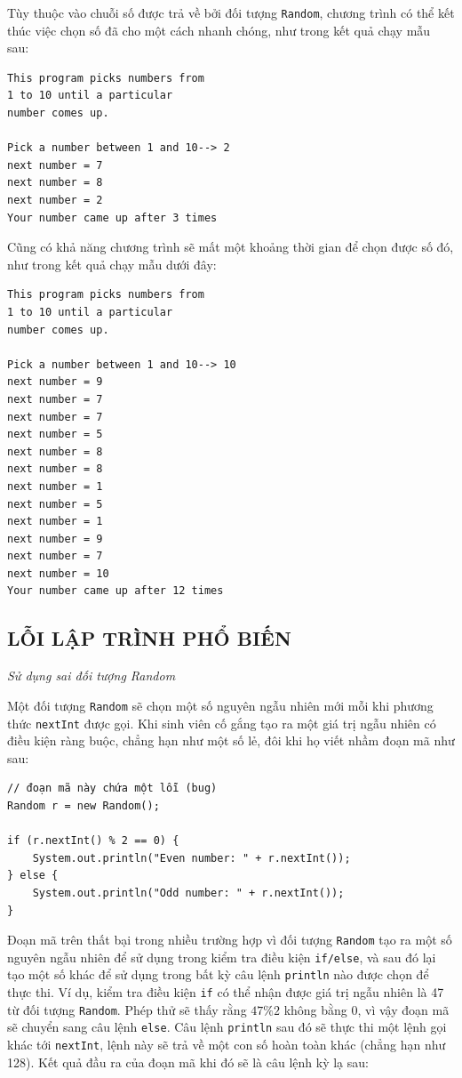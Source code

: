 Tùy thuộc vào chuỗi số được trả về bởi đối tượng \texttt{Random}, chương trình có thể kết thúc việc chọn số đã cho một cách nhanh chóng, như trong kết quả chạy mẫu sau:
\begin{verbatim}
This program picks numbers from 
1 to 10 until a particular 
number comes up. 
 
Pick a number between 1 and 10--> 2 
next number = 7 
next number = 8 
next number = 2 
Your number came up after 3 times
\end{verbatim}

Cũng có khả năng chương trình sẽ mất một khoảng thời gian để chọn được số đó, như trong kết quả chạy mẫu dưới đây:
\begin{verbatim}
This program picks numbers from 
1 to 10 until a particular 
number comes up. 
 
Pick a number between 1 and 10--> 10 
next number = 9 
next number = 7 
next number = 7 
next number = 5 
next number = 8 
next number = 8 
next number = 1 
next number = 5 
next number = 1 
next number = 9 
next number = 7 
next number = 10 
Your number came up after 12 times
\end{verbatim}

\subsection*{LỖI LẬP TRÌNH PHỔ BIẾN}
\textit{Sử dụng sai đối tượng Random}

Một đối tượng \texttt{Random} sẽ chọn một số nguyên ngẫu nhiên mới mỗi khi phương thức \texttt{nextInt} được gọi. Khi sinh viên cố gắng tạo ra một giá trị ngẫu nhiên có điều kiện ràng buộc, chẳng hạn như một số lẻ, đôi khi họ viết nhầm đoạn mã như sau:
\begin{verbatim}
// đoạn mã này chứa một lỗi (bug)
Random r = new Random(); 
 
if (r.nextInt() % 2 == 0) {
    System.out.println("Even number: " + r.nextInt());
} else {
    System.out.println("Odd number: " + r.nextInt());
}
\end{verbatim}

Đoạn mã trên thất bại trong nhiều trường hợp vì đối tượng \texttt{Random} tạo ra một số nguyên ngẫu nhiên để sử dụng trong kiểm tra điều kiện \texttt{if/else}, và sau đó lại tạo một số khác để sử dụng trong bất kỳ câu lệnh \texttt{println} nào được chọn để thực thi. Ví dụ, kiểm tra điều kiện \texttt{if} có thể nhận được giá trị ngẫu nhiên là 47 từ đối tượng \texttt{Random}. Phép thử sẽ thấy rằng $47 \% 2$ không bằng 0, vì vậy đoạn mã sẽ chuyển sang câu lệnh \texttt{else}. Câu lệnh \texttt{println} sau đó sẽ thực thi một lệnh gọi khác tới \texttt{nextInt}, lệnh này sẽ trả về một con số hoàn toàn khác (chẳng hạn như 128). Kết quả đầu ra của đoạn mã khi đó sẽ là câu lệnh kỳ lạ sau: